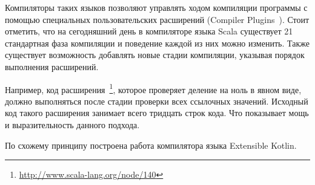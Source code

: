 Компиляторы таких языков позволяют управлять ходом компиляции программы с помощью специальных пользовательских расширений (Compiler Plugins~\cite{scala-compiler-plugin}). Стоит отметить, что на сегодняшний день в компиляторе языка Scala существует 21 стандартная фаза компиляции и поведение каждой из них можно изменить. Также существует возможность добавлять новые стадии компиляции, указывая порядок выполнения расширений.

Например, код расширения~\footnote{\url{http://www.scala-lang.org/node/140}}, которое проверяет деление на ноль в явном виде, должно выполняться после стадии проверки всех ссылочных значений. Исходный код такого расширения занимает всего тридцать строк кода. Что показывает мощь и выразительность данного подхода.

По схожему принципу построена работа компилятора языка Extensible Kotlin.